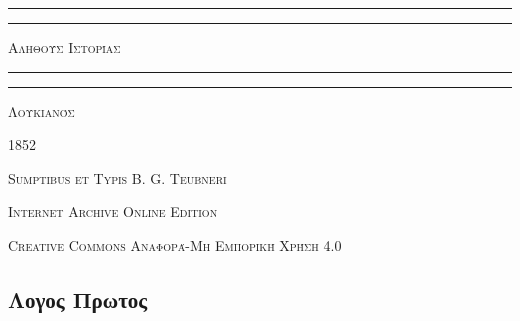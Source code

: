 \documentclass[a4paper, 11pt, oneside, polutonikogreek, german]{article}
\begin{document}
\begin{titlepage} %
	\centering %


	\rule{\textwidth}{1.6pt}\vspace*{-\baselineskip}\vspace*{2pt} %
	\rule{\textwidth}{0.4pt} %
	
	\vspace{1\baselineskip} %
	
	{\scshape\Huge Αληθούς Ιστορίας}
	
	\vspace{1\baselineskip} %

	\rule{\textwidth}{0.4pt}\vspace*{-\baselineskip}\vspace{3.2pt} %
	\rule{\textwidth}{1.6pt} %
	
	\vspace{1\baselineskip} %
	
	
	{\scshape \Large Λουκιανός}
 
        \vspace{0.5\baselineskip}
	
	\vspace*{1\baselineskip} %
	
        {\scshape \normalsize } %

        \vspace*{\fill}    

	\vspace{1\baselineskip}

	{\small\scshape 1852}
	
	{\small\scshape{Sumptibus et Typis B. G. Teubneri}}
	
	\vspace{0.5\baselineskip} %

        \scshape Internet Archive Online Edition%
    
	{\scshape\small Creative Commons Αναφορά-Μη Εμπορική Χρήση 4.0} %
\end{titlepage}
\setlength{\parskip}{1mm plus1mm minus1mm}
\clearpage
\large
\begin{center}
\section{Λογος Πρωτος}
\end{center}
\end{document}
